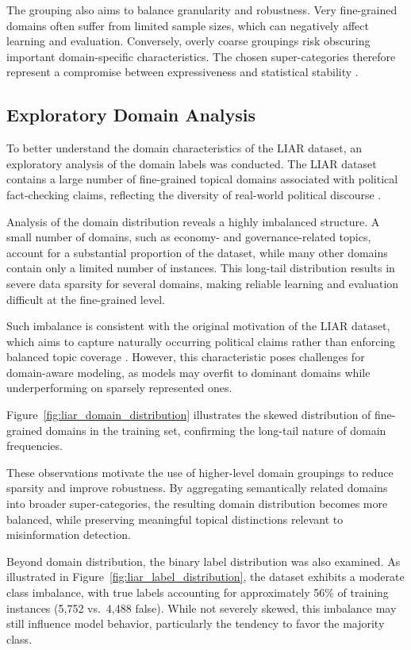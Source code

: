 The grouping also aims to balance granularity and robustness. Very fine-grained domains often suffer from limited sample sizes, 
which can negatively affect learning and evaluation. Conversely, overly coarse groupings risk obscuring important domain-specific 
characteristics. The chosen super-categories therefore represent a compromise between expressiveness and statistical stability 
\cite{henning-etal-2023-survey}.

\subsection{Exploratory Domain Analysis}
\label{sec:exploratory_domain_analysis}
To better understand the domain characteristics of the LIAR dataset, an exploratory analysis of the domain labels was conducted. The LIAR dataset contains a large number of fine-grained topical domains associated with political fact-checking claims, reflecting the diversity of real-world political discourse \cite{wang2017liarliarpantsfire}.

Analysis of the domain distribution reveals a highly imbalanced structure. A small number of domains, such as economy- and governance-related topics, account for a substantial proportion of the dataset, while many other domains contain only a limited number of instances. This long-tail distribution results in severe data sparsity for several domains, making reliable learning and evaluation difficult at the fine-grained level.

Such imbalance is consistent with the original motivation of the LIAR dataset, which aims to capture naturally occurring political claims rather than enforcing balanced topic coverage \cite{wang2017liarliarpantsfire}. However, this characteristic poses challenges for domain-aware modeling, as models may overfit to dominant domains while underperforming on sparsely represented ones.

Figure~\ref{fig:liar_domain_distribution} illustrates the skewed distribution of fine-grained domains in the training set, confirming the long-tail nature of domain frequencies.

These observations motivate the use of higher-level domain groupings to reduce sparsity and improve robustness. By aggregating semantically related domains into broader super-categories, the resulting domain distribution becomes more balanced, while preserving meaningful topical distinctions relevant to misinformation detection.

Beyond domain distribution, the binary label distribution was also examined. As illustrated in Figure~\ref{fig:liar_label_distribution}, the dataset exhibits a moderate class imbalance, with true labels accounting for approximately 56\% of training instances (5{,}752 vs.\ 4{,}488 false). While not severely skewed, this imbalance may still influence model behavior, particularly the tendency to favor the majority class.

